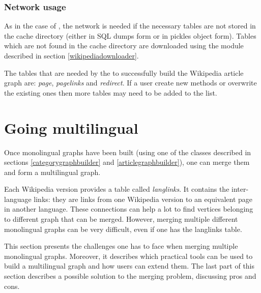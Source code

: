             \subsubsection{Network usage}    
                As in the case of , the network is needed if the necessary tables are not stored in the cache directory (either in SQL dumps form or in pickles object form). Tables which are not found in the cache directory are downloaded using the  module described in section \ref{wikipediadownloader}.
                
                The tables that are needed by the  to successfully build the Wikipedia article graph are: \emph{page}, \emph{pagelinks} and \emph{redirect}. If a user create new methods or overwrite the existing ones then more tables may need to be added to the list.
    \section{Going multilingual}
        Once monolingual graphs have been built (using one of the classes described in sections \ref{categorygraphbuilder} and \ref{articlegraphbuilder}), one can merge them and form a multilingual graph.
        
        Each Wikipedia version provides a table called \emph{langlinks}. It contains the inter-language links: they are links from one Wikipedia version to an equivalent page in another language. These connections can help a lot to find vertices belonging to different graph that can be merged. However, merging multiple different monolingual graphs can be very difficult, even if one has the langlinks table.
        
        This section presents the challenges one has to face when merging multiple monolingual graphs. Moreover, it describes which practical tools can be used to build a multilingual graph and how users can extend them. The last part of this section describes a possible solution to the merging problem, discussing pros and cons.
